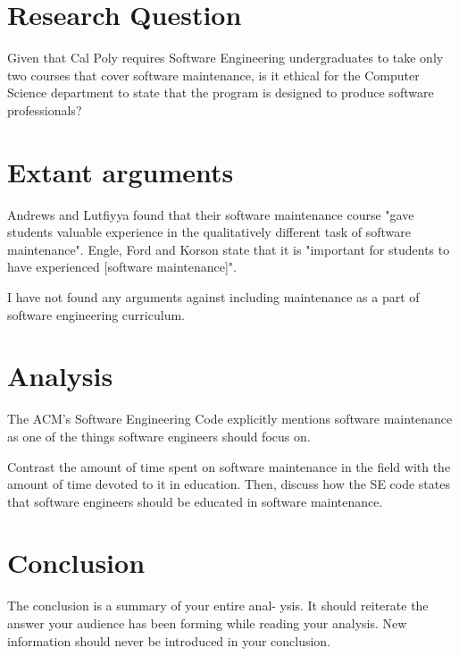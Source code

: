 \documentclass[11pt]{article}
\begin{document}
\begin{multicols}{2}
\section{Research Question}
Given that Cal Poly requires Software Engineering undergraduates to take only two courses that cover software maintenance, is it ethical for the Computer Science department to state that the program is designed to produce software professionals?

\section{Extant arguments}

Andrews and Lutfiyya found that their software maintenance course "gave students valuable experience in the qualitatively different task of software maintenance". \cite{Andrews:2000:ERS:794188.794320}  Engle, Ford and Korson state that it is "important for students to have experienced [software maintenance]". \cite{engle}

I have not found any arguments against including maintenance as a part of software engineering curriculum.

\section{Analysis}

The ACM's Software Engineering Code explicitly mentions software maintenance as one of the things software engineers should focus on. \cite{secode}

Contrast the amount of time spent on software maintenance in the field with the amount of time devoted to it in education.  Then, discuss how the SE code states that software engineers should be educated in software maintenance.

\section{Conclusion}
The conclusion is a summary of your entire anal- ysis. It should reiterate the answer your audience has been forming while reading your analysis. New information should never be introduced in your conclusion. \cite{texTemp}

\end{multicols}
\newpage

\nocite{*}




\end{document}
